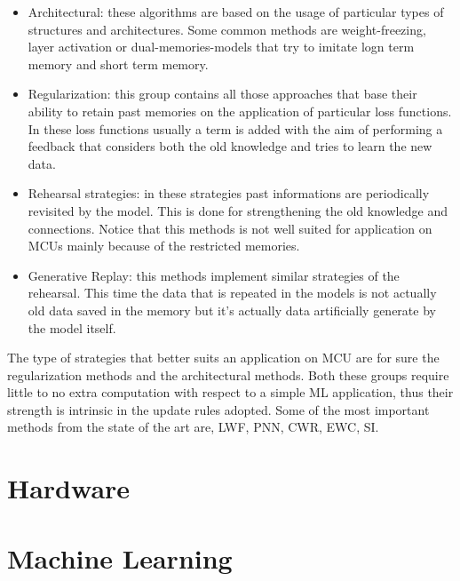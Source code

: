 \documentclass[12pt]{report}
\begin{document}
\begin{itemize}
\item Architectural: these algorithms are based on the usage of particular types of structures and architectures. Some common methods are weight-freezing, layer activation or dual-memories-models that try to imitate logn term memory and short term memory.
\item Regularization: this group contains all those approaches that base their ability to retain past memories on the application of particular loss functions. In these loss functions usually a term is added with the aim of performing a feedback that considers both the old knowledge and tries to learn the new data.
\item Rehearsal strategies: in these strategies past informations are periodically revisited by the model. This is done for strengthening the old knowledge and connections. Notice that this methods is not well suited for application on MCUs mainly because of the restricted memories. 
\item Generative Replay: this methods implement similar strategies of the rehearsal. This time the data that is repeated in the models is not actually old data saved in the memory but it's actually data artificially generate by the model itself. 
\end{itemize} 

The type of strategies that better suits an application on MCU are for sure the regularization methods and the architectural methods. Both these groups require little to no extra computation with respect to a simple ML application, thus their strength is intrinsic in the update rules adopted. Some of the most important methods from the state of the art are, LWF, PNN, CWR, EWC, SI. 









\chapter{Hardware} 








\chapter{Machine Learning}
\end{document}
